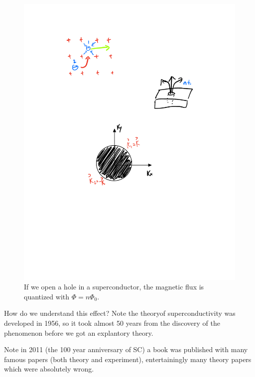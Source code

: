 \begin{itemize}
\begin{figure}[htbp]
        \includegraphics[scale=0.8]{Images/fig-quantizedflux.pdf}
        \caption{If we open a hole in a superconductor, the magnetic flux is quantized with $\Phi = n\Phi_0$.}
        \label{fig-quantizedflux}
    \end{figure}
\end{itemize}

How do we understand this effect? Note the theoryof superconductivity was developed in 1956, so it took almost 50 years from the discovery of the phenomenon before we got an explantory theory.

Note in 2011 (the 100 year anniversary of SC) a book was published with many famous papers (both theory and experiment), entertainingly many theory papers which were absolutely wrong.

